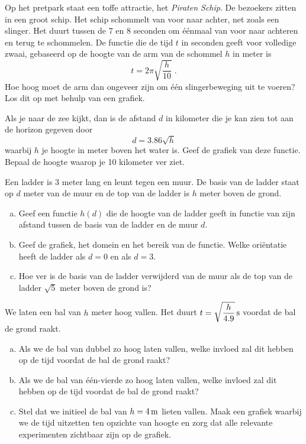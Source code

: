 \documentclass[12pt,twoside]{article}
\begin{document}
\begin{oefening} %
Op het pretpark staat een toffe attractie, het {\em Piraten Schip}. De bezoekers zitten in een groot schip. Het schip schommelt van voor naar achter, net zoals een slinger. Het duurt tussen de 7 en 8 seconden om éénmaal van voor naar achteren en terug te schommelen. De functie die de tijd $t$ in seconden geeft voor volledige zwaai, gebaseerd op de hoogte van de arm van de schommel $h$ in meter is
$$t=2\pi\sqrt{\dfrac{h}{10}}\;.$$
Hoe hoog moet de arm dan ongeveer zijn om één slingerbeweging uit te voeren? Los dit op met behulp van een grafiek.
\end{oefening}

\begin{oefening} %
Als je naar de zee kijkt, dan is de afstand $d$ in kilometer die je kan zien tot aan de horizon gegeven door
$$d=3.86\sqrt{h}$$
waarbij $h$ je hoogte in meter boven het water is. Geef de grafiek van deze functie. Bepaal de hoogte waarop je 10 kilometer ver ziet.
\end{oefening}

\begin{oefening} %
Een ladder is 3 meter lang en leunt tegen een muur. De basis van de ladder staat op $d$ meter van de muur en de top van de ladder is $h$ meter boven de grond.
\begin{enumerate}[(a)]
  \item Geef een functie $h(d)$ die de hoogte van de ladder geeft in functie van zijn afstand tussen de basis van de ladder en de muur $d$.
  \item Geef de grafiek, het domein en het bereik van de functie. Welke oriëntatie heeft de ladder als $d=0$ en als $d=3$.
  \item Hoe ver is de basis van de ladder verwijderd van de muur als de top van de ladder $\sqrt{5}$ meter boven de grond is?
\end{enumerate}
\end{oefening}

\begin{oefening} %
We laten een bal van $h$ meter hoog vallen. Het duurt $t=\sqrt{\dfrac{h}{4.9}}\s$ voordat de bal de grond raakt.
\begin{enumerate}[(a)]
  \item Als we de bal van dubbel zo hoog laten vallen, welke invloed zal dit hebben op de tijd voordat de bal de grond raakt?
  \item Als we de bal van één-vierde zo hoog laten vallen, welke invloed zal dit hebben op de tijd voordat de bal de grond raakt?
  \item Stel dat we initieel de bal van $h=4\m$ lieten vallen. Maak een grafiek waarbij we de tijd uitzetten ten opzichte van hoogte en zorg dat alle relevante experimenten zichtbaar zijn op de grafiek.
\end{enumerate}
\end{oefening}
\end{document}
